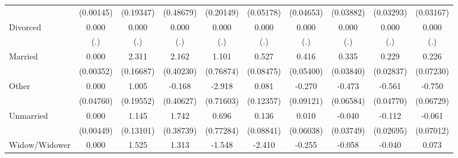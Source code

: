 {\begin{tabular}{l*{9}{c}}
                    &   (0.00145)         &   (0.19347)         &   (0.48679)         &   (0.20149)         &   (0.05178)         &   (0.04653)         &   (0.03882)         &   (0.03293)         &   (0.03167)         \\
Divorced            &       0.000         &       0.000         &       0.000         &       0.000         &       0.000         &       0.000         &       0.000         &       0.000         &       0.000         \\
                    &         (.)         &         (.)         &         (.)         &         (.)         &         (.)         &         (.)         &         (.)         &         (.)         &         (.)         \\
Married             &       0.000         &       2.311\sym{***}&       2.162\sym{***}&       1.101         &       0.527\sym{***}&       0.416\sym{***}&       0.335\sym{***}&       0.229\sym{***}&       0.226\sym{**} \\
                    &   (0.00352)         &   (0.16687)         &   (0.40230)         &   (0.76874)         &   (0.08475)         &   (0.05400)         &   (0.03840)         &   (0.02837)         &   (0.07230)         \\
Other               &       0.000         &       1.005\sym{***}&      -0.168         &      -2.918\sym{***}&       0.081         &      -0.270\sym{**} &      -0.473\sym{***}&      -0.561\sym{***}&      -0.750\sym{***}\\
                    &   (0.04760)         &   (0.19552)         &   (0.40627)         &   (0.71603)         &   (0.12357)         &   (0.09121)         &   (0.06584)         &   (0.04770)         &   (0.06729)         \\
Unmarried           &       0.000         &       1.145\sym{***}&       1.742\sym{***}&       0.696         &       0.136         &       0.010         &      -0.040         &      -0.112\sym{***}&      -0.061         \\
                    &   (0.00449)         &   (0.13101)         &   (0.38739)         &   (0.77284)         &   (0.08841)         &   (0.06038)         &   (0.03749)         &   (0.02695)         &   (0.07012)         \\
Widow/Widower       &       0.000         &       1.525\sym{***}&       1.313\sym{***}&      -1.548\sym{*}  &      -2.410\sym{***}&      -0.255\sym{***}&      -0.058         &      -0.040         &       0.073         \\

\end{tabular}}
